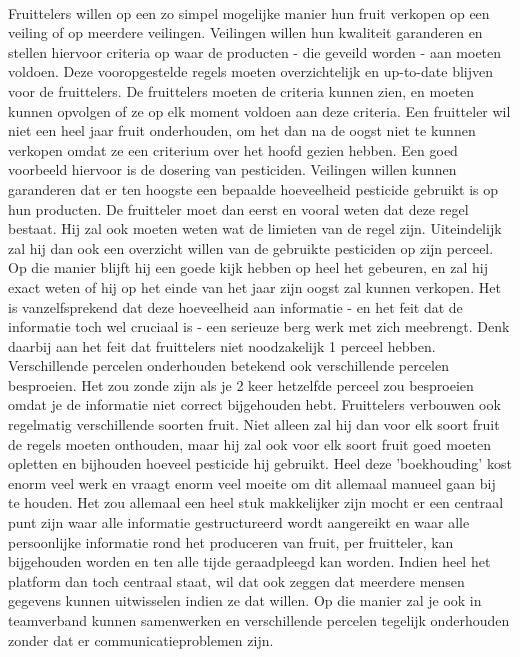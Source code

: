 \paragraph {} Fruittelers willen op een zo simpel mogelijke manier hun fruit
verkopen op een veiling of op meerdere veilingen. Veilingen willen hun kwaliteit
garanderen en stellen hiervoor criteria op waar de producten - die geveild worden - aan
moeten voldoen. Deze vooropgestelde regels moeten overzichtelijk en up-to-date blijven
voor de fruittelers. De fruittelers moeten de criteria kunnen zien, en moeten kunnen
opvolgen of ze op elk moment voldoen aan deze criteria. Een fruitteler wil niet een heel
jaar fruit onderhouden, om het dan na de oogst niet te kunnen verkopen omdat ze een
criterium over het hoofd gezien hebben. Een goed voorbeeld hiervoor is de dosering van
pesticiden. Veilingen willen kunnen garanderen dat er ten hoogste een bepaalde hoeveelheid
pesticide gebruikt is op hun producten. De fruitteler moet dan eerst en vooral weten
dat deze regel bestaat. Hij zal ook moeten weten wat de limieten van de regel zijn.
Uiteindelijk zal hij dan ook een overzicht willen van de gebruikte pesticiden op zijn
perceel. Op die manier blijft hij een goede kijk hebben op heel het gebeuren, en zal hij
exact weten of hij op het einde van het jaar zijn oogst zal kunnen verkopen. Het is
vanzelfsprekend dat deze hoeveelheid aan informatie - en het feit dat de informatie toch
wel cruciaal is - een serieuze berg werk met zich meebrengt. Denk daarbij aan het feit dat
fruittelers niet noodzakelijk 1 perceel hebben. Verschillende percelen onderhouden
betekend ook verschillende percelen besproeien. Het zou zonde zijn als je 2 keer hetzelfde
perceel zou besproeien omdat je de informatie niet correct bijgehouden hebt. Fruittelers
verbouwen ook regelmatig verschillende soorten fruit. Niet alleen zal hij dan voor elk
soort fruit de regels moeten onthouden, maar hij zal ook voor elk soort fruit goed moeten
opletten en bijhouden hoeveel pesticide hij gebruikt. Heel deze 'boekhouding' kost enorm
veel werk en vraagt enorm veel moeite om dit allemaal manueel gaan bij te houden. Het zou
allemaal een heel stuk makkelijker zijn mocht er een centraal punt zijn waar alle
informatie gestructureerd wordt aangereikt en waar alle persoonlijke informatie rond het
produceren van fruit, per fruitteler, kan bijgehouden worden en ten alle tijde
geraadpleegd kan worden. Indien heel het platform dan toch centraal staat, wil dat ook
zeggen dat meerdere mensen gegevens kunnen uitwisselen indien ze dat willen. Op die manier
zal je ook in teamverband kunnen samenwerken en verschillende percelen tegelijk
onderhouden zonder dat er communicatieproblemen zijn.

